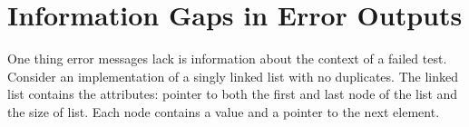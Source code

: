 




\newpage %





\section{Information Gaps in Error Outputs} %




One thing error messages lack is information about the context of a failed test.
Consider an implementation of a singly linked list with no duplicates. The linked list contains the attributes: pointer to both the first and last node of the list and the size of list.
Each node contains a value and a pointer to the next element.

